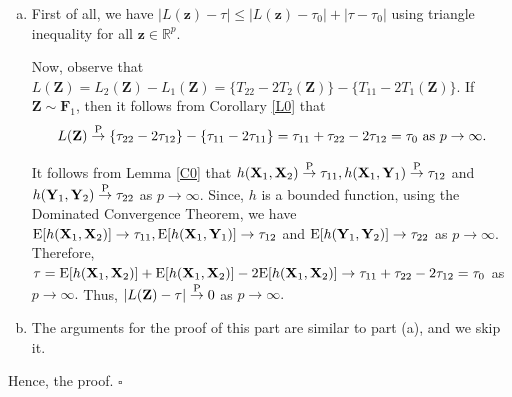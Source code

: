 \documentclass[twoside]{article}
\newcommand{\bX}{\mathbf{X}}
\newcommand{\bY}{\mathbf{Y}}
\newcommand{\bZ}{\mathbf{Z}}
\newcommand{\bF}{\mathbf{F}}
\newcommand{\bz}{\mathbf{z}}
\newcommand{\0}{\mathbf{0}}
\newcommand{\1}{\mathbf{1}}
\newcommand*{\QEDB}{\hfill\ensuremath{\square}}
\numberwithin{equation}{section}
\begin{document}
\begin{enumerate}[(a)]
 \item First of all, we have $|L(\bz)-\tau|\leq |L(\bz)-\tau_0|+|\tau-\tau_0|$ using triangle inequality for all $\bz\in\mathbb{R}^p.$

 Now, observe that $L(\bZ) = L_2(\bZ)- L_1(\bZ)= \{T_{22}-2T_2(\bZ)\}- \{T_{11} - 2T_1(\bZ)\}.$ If $\bZ\sim\bF_1$, then it follows from Corollary \ref{L0} that $$L(\bZ)\stackrel{\rm P}{\to}\{\tau_{22} - 2 \tau_{12}\} -\{ \tau_{11}-2\tau_{11}\}=\tau_{11}  + \tau_{22}- 2 \tau_{12}=\tau_0 \text{ as }p\to\infty.$$

 It follows from Lemma \ref{C0} that $h(\bX_1,\bX_2)\stackrel{\rm P}{\to}\tau_{11},h(\bX_1,\bY_1)\stackrel{\rm P}{\to}\tau_{12}$ and $h(\bY_1,\bY_2)\stackrel{\rm P}{\to}\tau_{22}$ as $p\to\infty.$ Since, $h$ is a bounded function, using the Dominated Convergence Theorem, we have  ${\rm E}[h(\bX_1,\bX_2)]\to\tau_{11},{\rm E}[h(\bX_1,\bY_1)]\to\tau_{12}$ and ${\rm E}[h(\bY_1,\bY_2)]\to\tau_{22}$ as $p\to\infty.$ Therefore, $\tau = {\rm E}[h(\bX_1,\bX_2)] + {\rm E}[h(\bX_1,\bX_2)] -2{\rm E}[h(\bX_1,\bX_2)]\to \tau_{11}+\tau_{22}-2\tau_{12}=\tau_0$ as $p\to\infty.$ Thus, $|L(\bZ)-\tau|\stackrel{\rm P}{\to}0$ as $p\to\infty.$
 \item The arguments for the proof of this part are similar to part (a), and we skip it.
\end{enumerate}
Hence, the proof. \hfill\QEDB\newline

\end{document}
